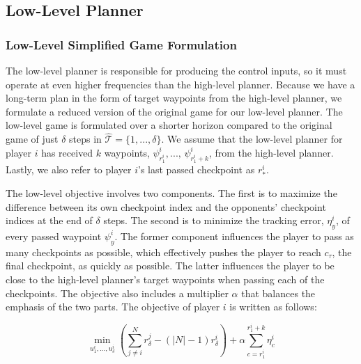 \subsection{Low-Level Planner}
\subsubsection{Low-Level Simplified Game Formulation}
The low-level planner is responsible for producing the control inputs, so it must operate at even higher frequencies than the high-level planner. Because we have a long-term plan in the form of target waypoints from the high-level planner, we formulate a reduced version of the original game for our low-level planner. The low-level game is formulated over a shorter horizon compared to the original game of just $\delta$ steps in $\hat{\mathcal{T}} = \{1, ..., \delta\}$. We assume that the low-level planner for player $i$ has received $k$ waypoints, $\psi^i_{r^i_{1}}, ..., \, \psi^i_{r^i_{1} + k}$, from the high-level planner. Lastly, we also refer to player $i$'s last passed checkpoint as $r^i_*$. 

The low-level objective involves two components. The first is to maximize the difference between its own checkpoint index and the opponents' checkpoint indices at the end of $\delta$ steps. The second is to minimize the tracking error, $\eta^i_y$, of every passed waypoint $\psi^i_{y}$. The former component influences the player to pass as many checkpoints as possible, which effectively pushes the player to reach $c_\tau$, the final checkpoint, as quickly as possible. The latter influences the player to be close to the high-level planner's target waypoints when passing each of the checkpoints. The objective also includes a multiplier $\alpha$ that balances the emphasis of the two parts. The objective of player $i$ is written as follows:

\begin{equation} \label{eq:ll_obj}
    \min_{u^i_{1}, ..., u^i_{\delta}} (\sum^N_{j \neq i}r^j_{\delta} - (|N|-1) r^i_{\delta}) + \alpha \sum_{c={r^i_{1}}}^{{r^i_{1}}+k} \eta^i_c
\end{equation}

